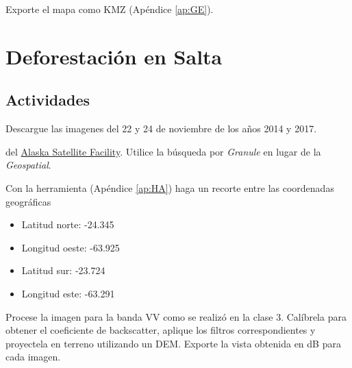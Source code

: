 \begin{que}
    Exporte el mapa como KMZ (Apéndice \ref{ap:GE}).
\end{que}


\section{Deforestación en Salta}


\subsection{Actividades}

\begin{que}
    Descargue las imagenes del 22 y 24 de noviembre de los años 2014 y 2017.
    \begin{center}\end{center}
      \begin{center}\end{center}
      del \href{https://vertex.daac.asf.alaska.edu/}{Alaska Satellite Facility}. Utilice la búsqueda por \emph{Granule} en lugar de la \emph{Geospatial}.
\end{que}

\begin{que}
    Con la herramienta  (Apéndice \ref{ap:HA}) haga un recorte entre las coordenadas geográficas
    \begin{itemize}
        \item Latitud norte: -24.345
        \item Longitud oeste: -63.925
        \item Latitud sur: -23.724
        \item Longitud este: -63.291
    \end{itemize}
\end{que}

\begin{que}
    Procese la imagen para la banda VV como se realizó en la clase 3. Calíbrela para obtener el coeficiente de backscatter, aplique los filtros correspondientes y proyectela en terreno utilizando un DEM. Exporte la vista obtenida en dB para cada imagen.
\end{que}

